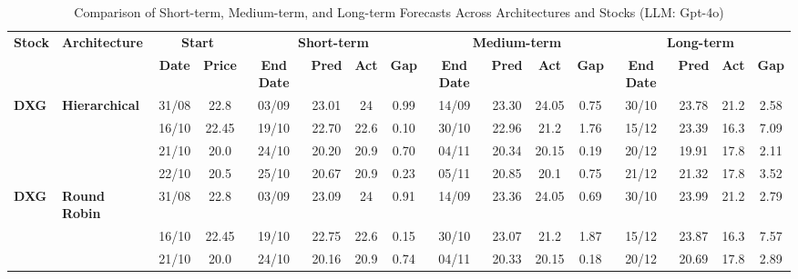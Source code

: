 \onecolumn
\begin{table}[!h]
\centering
\caption{Comparison of Short-term, Medium-term, and Long-term Forecasts Across Architectures and Stocks (LLM: Gpt-4o)}
\label{tab:full_forecast}
\setlength{\tabcolsep}{3pt}
\renewcommand{\arraystretch}{1.05}
\scriptsize
\begin{tabular}{llcc|cccc|cccc|cccc}
\toprule
\multirow{2}{*}{\textbf{Stock}} &
\multirow{2}{*}{\textbf{Architecture}} &
\multicolumn{2}{c|}{\textbf{Start}} &
\multicolumn{4}{c|}{\textbf{Short-term}} &
\multicolumn{4}{c|}{\textbf{Medium-term}} &
\multicolumn{4}{c}{\textbf{Long-term}} \\
\cmidrule(lr){3-4}
\cmidrule(lr){5-8}
\cmidrule(lr){9-12}
\cmidrule(lr){13-16}
& &
\textbf{Date} & \textbf{Price} &
\textbf{End Date} & \textbf{Pred} & \textbf{Act} & \textbf{Gap} &
\textbf{End Date} & \textbf{Pred} & \textbf{Act} & \textbf{Gap} &
\textbf{End Date} & \textbf{Pred} & \textbf{Act} & \textbf{Gap} \\
\midrule


\multirow{4}{*}{\textbf{DXG}} 
& \textbf{Hierarchical}
& 31/08 & 22.8 & 03/09 & 23.01 & 24 & 0.99 & 14/09 & 23.30 & 24.05 & 0.75 & 30/10 & 23.78 & 21.2 & 2.58 \\

& 
& 16/10 & 22.45 & 19/10 & 22.70 & 22.6 & 0.10 & 30/10 & 22.96 & 21.2 & 1.76 & 15/12 & 23.39 & 16.3 & 7.09 \\

& 
& 21/10 & 20.0 & 24/10 & 20.20 & 20.9 & 0.70 & 04/11 & 20.34 & 20.15 & 0.19 & 20/12 & 19.91 & 17.8 & 2.11 \\

&
& 22/10 & 20.5 & 25/10 & 20.67 & 20.9 & 0.23 & 05/11 & 20.85 & 20.1 & 0.75 & 21/12 & 21.32 & 17.8 & 3.52 \\
\midrule


\multirow{4}{*}{\textbf{DXG}} 
& \textbf{Round Robin}
& 31/08 & 22.8 & 03/09 & 23.09 & 24 & 0.91 & 14/09 & 23.36 & 24.05 & 0.69 & 30/10 & 23.99 & 21.2 & 2.79 \\

&
& 16/10 & 22.45 & 19/10 & 22.75 & 22.6 & 0.15 & 30/10 & 23.07 & 21.2 & 1.87 & 15/12 & 23.87 & 16.3 & 7.57 \\

&
& 21/10 & 20.0 & 24/10 & 20.16 & 20.9 & 0.74 & 04/11 & 20.33 & 20.15 & 0.18 & 20/12 & 20.69 & 17.8 & 2.89 \\


\end{tabular}
\end{table}
